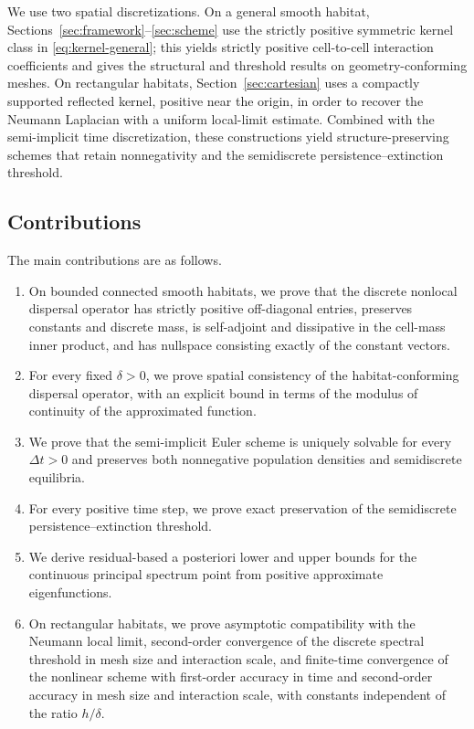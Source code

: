 \documentclass[11pt]{article}
\theoremstyle{definition}
\begin{document}
We use two spatial discretizations.  On a general smooth habitat,
Sections~\ref{sec:framework}--\ref{sec:scheme} use the strictly positive
symmetric kernel class in \eqref{eq:kernel-general}; this yields strictly
positive cell-to-cell interaction coefficients and gives the structural and
threshold results on geometry-conforming meshes. On rectangular habitats,
Section~\ref{sec:cartesian} uses a compactly supported reflected kernel,
positive near the origin, in order to recover the Neumann Laplacian with a
uniform local-limit estimate.  Combined with the semi-implicit time
discretization, these constructions yield structure-preserving schemes that
retain nonnegativity and the semidiscrete persistence--extinction threshold.

\subsection*{Contributions}
The main contributions are as follows.
\begin{enumerate}[label=(C\arabic*),leftmargin=2.8em]
\item On bounded connected smooth habitats, we prove that the discrete nonlocal dispersal operator has strictly positive off-diagonal entries, preserves constants and discrete mass, is self-adjoint and dissipative in the cell-mass inner product, and has nullspace consisting exactly of the constant vectors.
\item For every fixed $\delta>0$, we prove spatial consistency of the habitat-conforming dispersal operator, with an explicit bound in terms of the modulus of continuity of the approximated function.
\item We prove that the semi-implicit Euler scheme is uniquely solvable for every $\Delta t>0$ and preserves both nonnegative population densities and semidiscrete equilibria.
\item For every positive time step, we prove exact preservation of the semidiscrete persistence--extinction threshold.
\item We derive residual-based a posteriori lower and upper bounds for the continuous principal spectrum point from positive approximate eigenfunctions.
\item On rectangular habitats, we prove asymptotic compatibility with the Neumann local limit, second-order convergence of the discrete spectral threshold in mesh size and interaction scale, and finite-time convergence of the nonlinear scheme with first-order accuracy in time and second-order accuracy in mesh size and interaction scale, with constants independent of the ratio $h/\delta$.
\end{enumerate}
\end{document}
